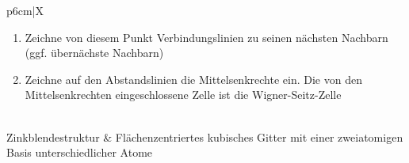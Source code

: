 \documentclass{article}
\begin{document}
\begin{xltabular}{\linewidth}{p{6cm}|X}
{\begin{enumerate}
			\item Zeichne von diesem Punkt Verbindungslinien zu seinen nächsten Nachbarn (ggf. übernächste Nachbarn)
		
			\item Zeichne auf den Abstandslinien die Mittelsenkrechte ein. Die von den Mittelsenkrechten eingeschlossene Zelle ist die Wigner-Seitz-Zelle
		\end{enumerate} } \\
	\hline
		Zinkblendestruktur & Flächenzentriertes kubisches Gitter mit einer zweiatomigen Basis unterschiedlicher Atome \\
	\hline\hline
\end{xltabular}
\end{document}
